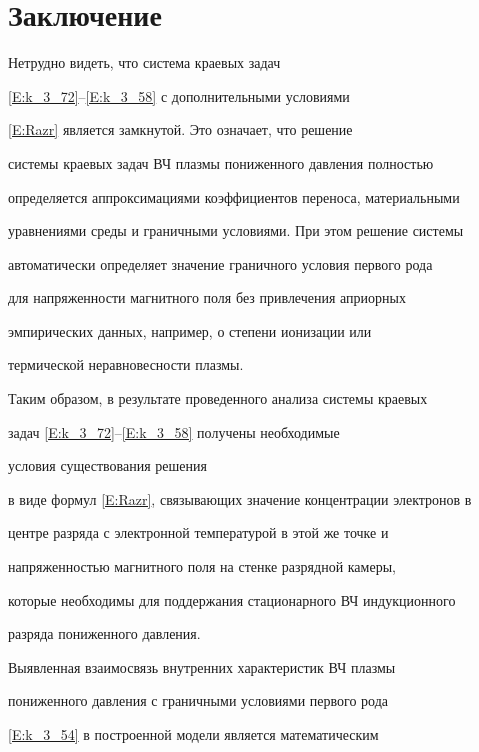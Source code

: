 \section{Заключение}








Нетрудно видеть, что система краевых задач


\eqref{E:k_3_72}--\eqref{E:k_3_58} с дополнительными условиями


\eqref{E:Razr} является замкнутой. Это означает, что решение


системы краевых задач ВЧ плазмы пониженного давления полностью


определяется аппроксимациями коэффициентов переноса, материальными


уравнениями среды и граничными условиями. При этом решение системы


автоматически определяет значение граничного условия первого рода


для напряженности магнитного поля без привлечения априорных


эмпирических данных, например, о степени ионизации или


термической неравновесности плазмы.








Таким образом, в результате проведенного анализа системы краевых


задач \eqref{E:k_3_72}--\eqref{E:k_3_58} получены необходимые


условия существования решения


в виде формул \eqref{E:Razr}, связывающих значение концентрации электронов в


центре разряда с электронной температурой в этой же точке и


напряженностью магнитного поля на стенке разрядной камеры,


которые необходимы для поддержания стационарного ВЧ индукционного


разряда пониженного давления.





Выявленная взаимосвязь внутренних характеристик ВЧ плазмы


пониженного давления с граничными условиями первого рода


\eqref{E:k_3_54} в построенной модели является математическим



